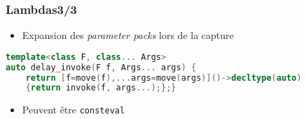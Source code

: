 \documentclass[C++.tex]{subfiles}
\begin{document}
\begin{frame}[fragile]
	\frametitle{Lambdas\titlehfill{}3/3}
	\begin{itemize}
		\item Expansion des \textit{parameter packs} lors de la capture
	\end{itemize}

	\begin{lstlisting}[language=C++]
template<class F, class... Args>
auto delay_invoke(F f, Args... args) {
	return [f=move(f),...args=move(args)]()->decltype(auto) 
	{return invoke(f, args...);};}\end{lstlisting}

	\begin{itemize}
		\item Peuvent être \lstinline|consteval|
	\end{itemize}
\end{frame}
\end{document}
